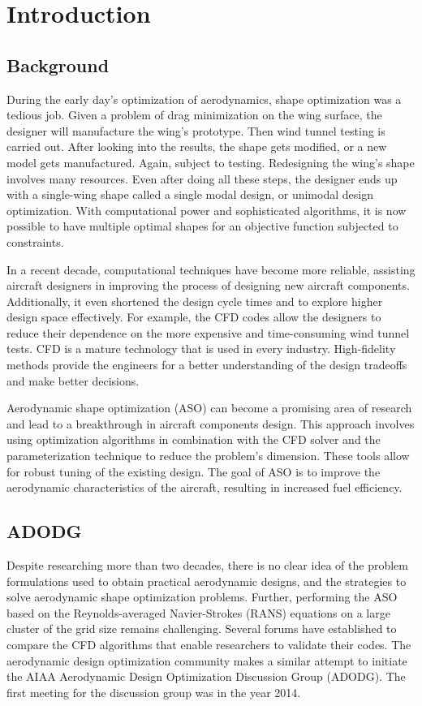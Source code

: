 \chapter{Introduction}
\label{chap:Introduction}
\section{Background}
During the early day's optimization of aerodynamics, shape optimization was a tedious job. Given a problem of drag minimization on the wing surface, the designer will manufacture the wing's prototype. Then wind tunnel testing is carried out. After looking into the results, the shape gets modified, or a new model gets manufactured. Again, subject to testing. Redesigning the wing's shape involves many resources. Even after doing all these steps, the designer ends up with a single-wing shape called a single modal design, or unimodal design optimization. With computational power and sophisticated algorithms, it is now possible to have multiple optimal shapes for an objective function subjected to constraints.

In a recent decade, computational techniques have become more reliable, assisting aircraft designers in improving the process of designing new aircraft components. Additionally, it even shortened the design cycle times and to explore higher design space effectively. For example, the CFD codes allow the designers to reduce their dependence on the more expensive and time-consuming wind tunnel tests. CFD is a mature technology that is used in every industry. High-fidelity methods provide the engineers for a better understanding of the design tradeoffs and make better decisions.

Aerodynamic shape optimization (ASO) can become a promising area of research and lead to a breakthrough in aircraft components design. This approach involves using optimization algorithms in combination with the CFD solver and the parameterization technique to reduce the problem's dimension.  These tools allow for robust tuning of the existing design. The goal of ASO is to improve the aerodynamic characteristics of the aircraft, resulting in increased fuel efficiency. 

\section{ADODG}
Despite researching more than two decades, there is no clear idea of the problem formulations used to obtain practical aerodynamic designs, and the strategies to solve aerodynamic shape optimization problems. Further,    performing the ASO based on the Reynolds-averaged Navier-Strokes (RANS) equations on a large cluster of the grid size remains challenging.  Several forums have established to compare the CFD algorithms that enable researchers to validate their codes. The aerodynamic design optimization community makes a similar attempt to initiate the AIAA Aerodynamic Design Optimization Discussion Group (ADODG).  The first meeting for the discussion group was in the year 2014.

